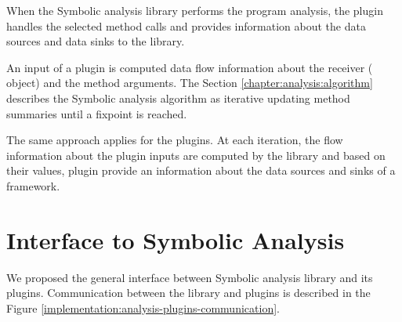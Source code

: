 When the Symbolic analysis library performs the program analysis,
the plugin handles the selected method calls and provides
information about the data sources and data sinks to the library.

An input of a plugin is computed data flow information
about the receiver ( object) and the method arguments.
The Section \ref{chapter:analysis:algorithm} describes the Symbolic analysis algorithm
as iterative updating method summaries until a fixpoint is reached.

The same approach applies for the plugins. At each iteration, the flow information
about the plugin inputs are computed by the library and based on their values,
plugin provide an information about the data sources and sinks of a framework.




\section{Interface to Symbolic Analysis \label{chapter:implementation:interface}}

We proposed the general interface between Symbolic analysis library and its plugins.
Communication between the library and plugins is described in the
Figure \ref{implementation:analysis-plugins-communication}.

